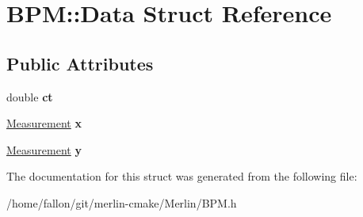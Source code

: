 \hypertarget{structBPM_1_1Data}{}\section{B\+PM\+:\+:Data Struct Reference}
\label{structBPM_1_1Data}
\subsection*{Public Attributes}
\begin{DoxyCompactItemize}
\item 
\mbox{\label{structBPM_1_1Data_ae3c713a2a275b2af6aec1b3daaf82fb9}} 
double {\bfseries ct}
\item 
\mbox{\label{structBPM_1_1Data_a3e76695dcc552f38a13849215db9a53e}} 
\hyperlink{structMeasurement}{Measurement} {\bfseries x}
\item 
\mbox{\label{structBPM_1_1Data_a3f3087f435f87077fe43c8ebdd9f7dce}} 
\hyperlink{structMeasurement}{Measurement} {\bfseries y}
\end{DoxyCompactItemize}


The documentation for this struct was generated from the following file\+:\begin{DoxyCompactItemize}
\item 
/home/fallon/git/merlin-\/cmake/\+Merlin/B\+P\+M.\+h\end{DoxyCompactItemize}
